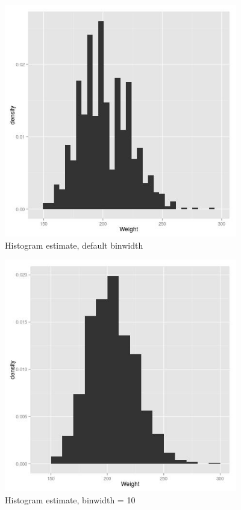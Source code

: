 \begin{figure}[tb] 
\centerline{
\includegraphics[width=4.0in]{BaseballWtBWDefault.jpg} 
}
\caption{Histogram estimate, default binwidth}
\label{b1}  
\end{figure}

\begin{figure}[tb] 
\centerline{
\includegraphics[width=4.0in]{BaseballWtBW10.jpg} 
}
\caption{Histogram estimate, binwidth = 10}
\label{b2}  
\end{figure}

